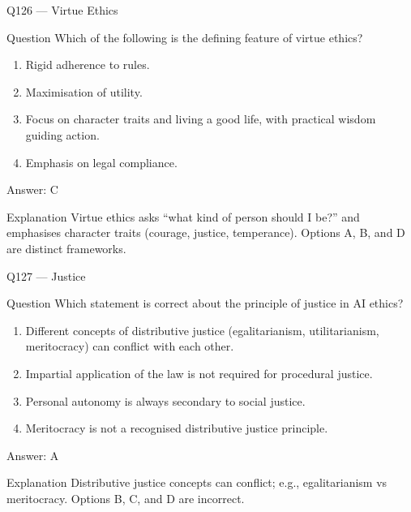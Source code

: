 \documentclass[aspectratio=169,8pt]{beamer}
\begin{document}
\begin{frame}{Q126 --- Virtue Ethics}
\begin{block}{Question}
Which of the following is the defining feature of virtue ethics?
\begin{enumerate}
\item Rigid adherence to rules.
\item Maximisation of utility.
\item Focus on character traits and living a good life, with practical wisdom guiding action.
\item Emphasis on legal compliance.
\end{enumerate}
	\end{block}
\begin{exampleblock}{Answer: C}\end{exampleblock}
\begin{block}{Explanation}
Virtue ethics asks ``what kind of person should I be?'' and emphasises character traits (courage, justice, temperance). Options A, B, and D are distinct frameworks.
\end{block}
\end{frame}

\begin{frame}{Q127 --- Justice}
\begin{block}{Question}
Which statement is correct about the principle of justice in AI ethics?
\begin{enumerate}
\item Different concepts of distributive justice (egalitarianism, utilitarianism, meritocracy) can conflict with each other.
\item Impartial application of the law is not required for procedural justice.
\item Personal autonomy is always secondary to social justice.
\item Meritocracy is not a recognised distributive justice principle.
\end{enumerate}
	\end{block}
\begin{exampleblock}{Answer: A}\end{exampleblock}
\begin{block}{Explanation}
Distributive justice concepts can conflict; e.g., egalitarianism vs meritocracy. Options B, C, and D are incorrect.
\end{block}
\end{frame}
\end{document}
